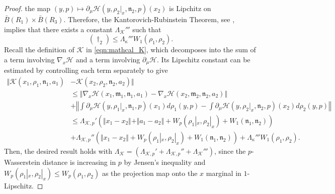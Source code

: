 \documentclass{article}
\begin{document}
\begin{appendices}
\begin{proof}
the map $(y,p)\mapsto \partial_\mu\mathcal H(y,\rho_2|_x,\mathfrak{n}_2,p)(x_2)$ is Lipchitz on $\bar B(R_1)\times\bar B(R_3)$. Therefore, the Kantorovich-Rubinstein Theorem, see \cite{villani2008optimal}, implies that there exists a constant $\Lambda_{\mathcal K}'''$ such that
\[
(\dagger_2)\le \Lambda_{\kappa}'''W_1(\rho_1,\rho_2).
\]
Recall the definition of $\mathcal K$ in \eqref{eqn:mathcal_K}, which decomposes into the sum of a term involving $\nabla_x\mathcal H$ and a term involving $\partial_\mu\mathcal H$. Its Lipschitz constant can be estimated by controlling each term separately to give 
\begin{align*}
  \Vert \mathcal K(x_1,\rho_1,\mathfrak{n}_1,a_1)&-\mathcal K(x_2,\rho_2,\mathfrak{n}_2,a_2)\Vert \\
  &\le \Vert \nabla_x \mathcal H(x_1, \mathfrak{m}_1,\mathfrak{n}_1,a_1)- \nabla_x \mathcal H(x_2, \mathfrak{m}_2,\mathfrak{n}_2,a_2)\Vert\\&+\left\Vert \int \partial_\mu \mathcal H(y,\rho_1|_x,\mathfrak{n}_1,p)(x_1)d\rho_1(y,p)- \int \partial_\mu \mathcal H(y,\rho_2|_x,\mathfrak{n}_2,p)(x_2)d\rho_2(y,p) \right\Vert\\
  & \le \Lambda_{\mathcal K,p}'\left(\Vert x_1-x_2\Vert+\Vert a_1-a_2\Vert +W_p(\rho_1|_x,\rho_2|_x)+W_1(\mathfrak{n}_1,\mathfrak{n}_2)\right) \\&+  \Lambda_{\mathcal K,p}''\left( \Vert x_1-x_2\Vert +W_{p}(\rho_1|_x,\rho_2|_x)+ W_1(\mathfrak{n}_1,\mathfrak{n}_2)\right)+\Lambda_{\kappa}'''W_1(\rho_1,\rho_2).
\end{align*}
Then, the desired result holds with $\Lambda_{\mathcal K}=(\Lambda_{\mathcal K,p}'+\Lambda_{\mathcal K,p}''+ \Lambda_{\mathcal K}''')$, since the $p$-Wasserstein distance is increasing in $p$ by Jensen's inequality and $W_p(\rho_1|_x,\rho_2|_x)\le W_p(\rho_1,\rho_2)$ as the projection map onto the $x$ marginal in $1$-Lipschitz.
\end{proof}



\end{appendices}
\end{document}
